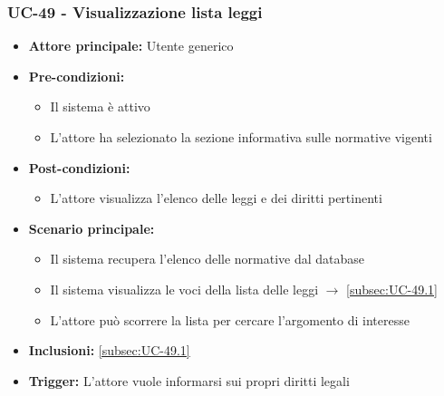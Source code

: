 \documentclass[a4paper,12pt]{article}
\begin{document}
\subsubsection{UC-49 - Visualizzazione lista leggi} \label{sec:UC-49}
\begin{itemize}
    \item \textbf{Attore principale:} Utente generico
    \item \textbf{Pre-condizioni:}
    \begin{itemize}
        \item Il sistema è attivo
        \item L'attore ha selezionato la sezione informativa sulle normative vigenti
    \end{itemize}
    \item \textbf{Post-condizioni:}
    \begin{itemize}
        \item L'attore visualizza l'elenco delle leggi e dei diritti pertinenti
    \end{itemize}
    \item \textbf{Scenario principale:} 
    \begin{itemize}
        \item Il sistema recupera l'elenco delle normative dal database
        \item Il sistema visualizza le voci della lista delle leggi $\rightarrow$ \ref{subsec:UC-49.1}
        \item L'attore può scorrere la lista per cercare l'argomento di interesse
    \end{itemize}
    \item \textbf{Inclusioni:} \ref{subsec:UC-49.1}
    \item \textbf{Trigger:} L'attore vuole informarsi sui propri diritti legali
\end{itemize}
\end{document}
